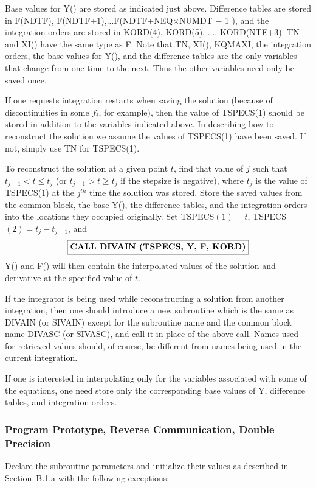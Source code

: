 \documentclass[twoside]{MATH77}
\begin{document}
Base values for Y() are stored as indicated just above. Difference tables
are stored in F(NDTF), F(NDTF+1),...F(NDTF+NEQ$\times $NUMDT $-$ 1%
), and the integration orders are stored in KORD(4), KORD(5), ...,
KORD(NTE+3). TN and XI() have the same type as F. Note that TN, XI(),
KQMAXI, the integration orders, the base values for Y(), and the difference
tables are the only variables that change from one time to the next. Thus
the other variables need only be saved once.

If one requests integration restarts when saving the solution (because of
discontinuities in some $f_i$, for example), then the value of TSPECS(1)
should be stored in addition to the variables indicated above. In describing
how to reconstruct the solution we assume the values of TSPECS(1) have been
saved. If not, simply use TN for TSPECS(1).

To reconstruct the solution at a given point $t$, find that value of $j$
such that $t_{j-1}<t\leq t_j$ (or $t_{j-1}>t\geq t_j$ if the stepsize is
negative), where $t_j$ is the value of TSPECS(1) at the $j^{th}$ time the
solution was stored. Store the saved values from the common block, the base
Y(), the difference tables, and the integration orders into the locations
they occupied originally. Set TSPECS$(1)=t$, TSPECS$(2)=t_j-t_{j-1}$, and
$$
\fbox{\bf CALL DIVAIN (TSPECS, Y, F, KORD)}
$$
Y() and F() will then contain the interpolated values of the solution and
derivative at the specified value of $t.$

If the integrator is being used while reconstructing a solution from another
integration, then one should introduce a new subroutine which is the same as
DIVAIN (or SIVAIN) except for the subroutine name and the common block name
DIVASC (or SIVASC), and call it in place of the above call. Names used for
retrieved values should, of course, be different from names being used in
the current integration.

If one is interested in interpolating only for the variables associated with
some of the equations, one need store only the corresponding base values of
Y, difference tables, and integration orders.

\subsubsection{Program Prototype, Reverse Communication, Double Precision%
\label{RevCom}}

Declare the subroutine parameters and initialize their values as described
in Section\ B.1.a with the following exceptions:
\end{document}
